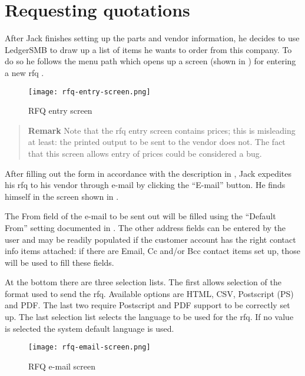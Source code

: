 \section{Requesting quotations}

After Jack finishes setting up the parts and vendor information, he decides to use LedgerSMB to draw
up a list of items he wants to order from this company. To do so he follows the menu path
 which opens up a screen (shown
in ) for entering a new \gls{rfq} .

\begin{figure}[h]
\centering
\texttt{[image: rfq-entry-screen.png]}
\caption{RFQ entry screen}
\label{fig:bus-rfq-entry-screen}
\end{figure}

\begin{quotation}
\textbf{Remark} Note that the \gls{rfq} entry screen contains prices; this is misleading
at least: the printed output to be sent to the vendor does not. The fact that this screen
allows entry of prices could be considered a bug.
\end{quotation}

After filling out the form in accordance with the description in ,
Jack expedites his \gls{rfq} to his vendor through e-mail by clicking the ``E-mail'' button. He finds
himself in the screen shown in .

The From field of the e-mail to be sent out will be filled using the ``Default From'' setting documented
in . The other address fields can be entered by the user and may be readily
populated if the customer account has the right contact info items attached: if there are Email, Cc and/or
Bcc contact items set up, those will be used to fill these fields.

At the bottom there are three selection lists. The first allows selection of the format used to send the
\gls{rfq}. Available options are HTML, CSV, Postscript (PS) and PDF. The last two require Postscript and PDF
support to be correctly set up. The last selection list selects the language to be used for the
\gls{rfq}. If no value is selected the system default language is used.

\begin{figure}[h]
\centering
\texttt{[image: rfq-email-screen.png]}
\caption{RFQ e-mail screen}
\label{fig:rfq-email-screen}
\end{figure}

